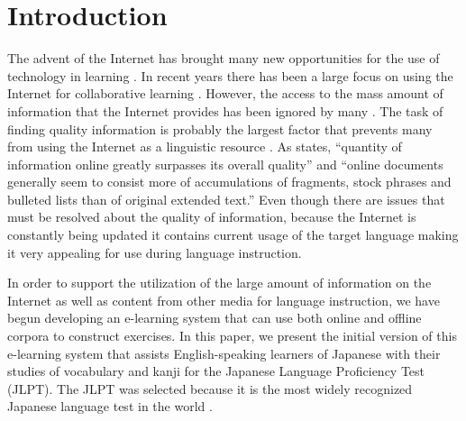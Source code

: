 \documentclass[english]{jnlp_1.4}
\begin{document}
\setcounter{secnumdepth}{3}

\maketitle

\section{Introduction}

The advent of the Internet has brought many new opportunities for the use of technology in learning \cite{Book_Bransford}. In recent years there has been a large focus on using the Internet for collaborative learning \cite{Article_Shih}. However, the access to the mass amount of information that the Internet provides has been ignored by many \cite{Article_Fletcher}. The task of finding quality information is probably the largest factor that prevents many from using the Internet as a linguistic resource \cite{Article_Fletcher}. As \cite{Article_Fletcher} states, ``quantity of information online greatly surpasses its overall quality'' and ``online documents generally seem to consist more of accumulations of fragments, stock phrases and bulleted lists than of original extended text.'' Even though there are issues that must be resolved about the quality of information, because the Internet is constantly being updated it contains current usage of the target language \cite{Article_Fletcher} making it very appealing for use during language instruction.

In order to support the utilization of the large amount of information on the Internet as well as content from other media for language instruction, we have begun developing an e-learning system that can use both online and offline corpora to construct exercises. In this paper, we present the initial version of this e-learning system that assists English-speaking learners of Japanese with their studies of vocabulary and kanji for the Japanese Language Proficiency Test (JLPT). The JLPT was selected because it is the most widely recognized Japanese language test in the world \cite{Web_JLPT}. 
\end{document}
